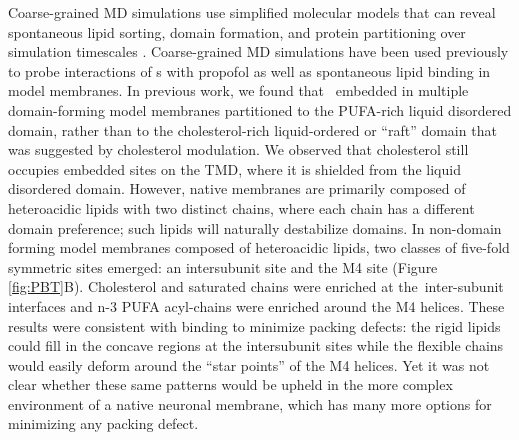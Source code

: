 Coarse-grained MD simulations use simplified molecular models that can reveal spontaneous lipid sorting, domain formation, and protein partitioning over simulation timescales \cite{Domanski2012,Chavent2016,Carpenter2018,Ingolfsson2020}. Coarse-grained MD simulations have been used previously to probe interactions of \plgic s with propofol\cite{Joseph2016} as well as spontaneous lipid binding in model membranes\cite{Sharp2019,Woods2019,Tong2019}.  
In previous work, we found that \nachr~embedded in multiple domain-forming model membranes partitioned to the PUFA-rich liquid disordered domain\cite{Sharp2019}, rather than to the cholesterol-rich liquid-ordered or ``raft'' domain that was suggested by cholesterol modulation.  We observed that cholesterol still occupies embedded sites on the \nachr{} TMD, where it is shielded from the liquid disordered domain. However, native membranes are primarily composed of heteroacidic lipids with two distinct chains, where each chain has a different domain preference; such lipids will naturally destabilize domains. In non-domain forming model membranes composed of heteroacidic lipids, two classes of five-fold symmetric sites emerged: an intersubunit site and the M4 site (Figure \ref{fig:PBT}B).  Cholesterol and saturated chains were enriched at the~inter-subunit interfaces and n-3 PUFA acyl-chains were enriched around the M4 helices\cite{Woods2019}. These results were consistent with binding to minimize packing defects: the rigid lipids could fill in the concave regions at the intersubunit sites while the flexible chains would easily deform around the ``star points'' of the M4 helices.  Yet it was not clear whether these same patterns would be upheld in the more complex environment of a native neuronal membrane, which has many more options for minimizing any packing defect.  


